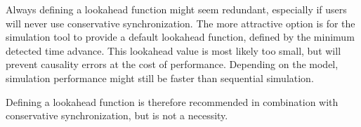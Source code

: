 Always defining a lookahead function might seem redundant, especially if users will never use conservative synchronization.
The more attractive option is for the simulation tool to provide a default lookahead function, defined by the minimum detected time advance.
This lookahead value is most likely too small, but will prevent causality errors at the cost of performance.
Depending on the model, simulation performance might still be faster than sequential simulation.

Defining a lookahead function is therefore recommended in combination with conservative synchronization, but is not a necessity.
